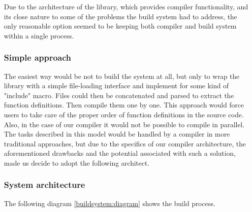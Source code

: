 Due to the architecture of the library, which provides compiler
functionality, and its close nature to some of the problems the build
system had to address, the only reasonable option seemed to be keeping
both compiler and build system within a single process.

\hypertarget{simple-approach}{%
\subsubsection{Simple approach}\label{simple-approach}}
The easiest way would be not to build the system at all,
but only to wrap the library with a simple file-loading interface and
implement for some kind of "include" macro. Files could then be
concatenated and parsed
to extract the function definitions. Then compile them one by one. This
approach would force users to take care of the proper order of function definitions
in the source code. Also, in the case of our compiler it would not be possible to
compile in parallel. The tasks described in this model would
be handled by a compiler in more traditional approaches, but due
to the specifics of our compiler architecture, the aforementioned drawbacks
and the potential associated with such a solution, made us decide to adopt
the following architect. 


\hypertarget{system-architecture}{%
\subsubsection{System architecture}\label{system-architecture}}

The following diagram \ref{buildsystem:diagram} shows the build process.

